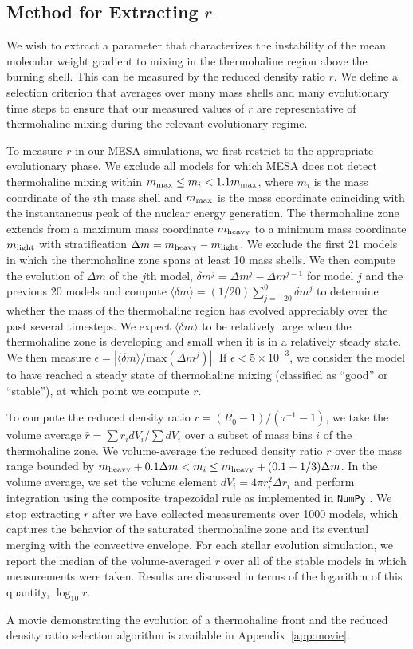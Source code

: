 
\subsection{Method for Extracting $r$}
%
We wish to extract a parameter that characterizes the instability of the mean molecular weight gradient to mixing in the thermohaline region above the burning shell. This can be measured by the reduced density ratio $r$.
We define a selection criterion that averages over many mass shells and many evolutionary time steps to ensure that our measured values of $r$ are representative of thermohaline mixing during the relevant evolutionary regime.

To measure $r$ in our MESA simulations, we first restrict to the appropriate evolutionary phase. We exclude all models for which MESA does not detect thermohaline mixing within $m_{\rm max} \leq m_i < 1.1 m_{\rm max}$, where $m_i$ is the mass coordinate of the $i$th mass shell and $m_{\rm max}$ is the mass coordinate coinciding with the instantaneous peak of the nuclear energy generation.
The thermohaline zone extends from a maximum mass coordinate $m_{\rm heavy}$ to a minimum mass coordinate $m_{\rm light}$ with stratification $\Delta m = m_{\rm heavy} - m_{\rm light}$.
We exclude the first 21 models in which the thermohaline zone spans at least 10 mass shells.
We then compute the evolution of $\Delta m$ of the $j$th model, $\delta m^j = \Delta m^{j} - \Delta m^{j-1}$ for model $j$ and the previous 20 models and compute $\langle \delta m \rangle = (1/20)\sum_{j=-20}^0 \delta m^j$ to determine whether the mass of the thermohaline region has evolved appreciably over the past several timesteps. We expect $\langle \delta m \rangle$ to be relatively large when the thermohaline zone is developing and small when it is in a relatively steady state.
We then measure $\epsilon = |\langle \delta m \rangle / \mathrm{max}(\Delta m^j)|$. If $\epsilon < 5 \times 10^{-3}$, we consider the model to have reached a steady state of thermohaline mixing (classified as ``good'' or ``stable''), at which point we compute $r$.

To compute the reduced density ratio $r = (R_0 - 1)/(\tau^{-1} - 1)$, we take the volume average $\bar{r} = \sum r_i dV_i / \sum dV_i$ over a subset of mass bins $i$ of the thermohaline zone. We volume-average the reduced density ratio $r$ over the mass range bounded by $m_{\rm{heavy}} + 0.1\Delta m  < m_i \leq m_{\rm heavy} + (0.1 + 1/3)\Delta m$.
In the volume average, we set the volume element $dV_i = 4\pi r_i^2 \Delta r_i$ and perform integration using the composite trapezoidal rule as implemented in \texttt{NumPy} \citep{numpy}.
We stop extracting $r$ after we have collected measurements over 1000 models, which captures the behavior of the saturated thermohaline zone and its eventual merging with the convective envelope. For each stellar evolution simulation, we report the median of the volume-averaged $r$ over all of the stable models in which measurements were taken. Results are discussed in terms of the logarithm of this quantity, $\log_{10} r$.

A movie demonstrating the evolution of a thermohaline front and the reduced density ratio selection algorithm is available in Appendix~\ref{app:movie}.